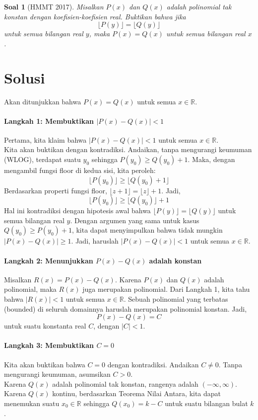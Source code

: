 \documentclass[12pt]{article}
\theoremstyle{mystyle}
\newtheorem{problem}{Soal}
\begin{document}
\begin{problem}[HMMT 2017]
Misalkan $P(x)$ dan $Q(x)$ adalah polinomial tak konstan dengan koefisien-koefisien real. Buktikan bahwa jika
\[ \lfloor P(y) \rfloor = \lfloor Q(y) \rfloor \]
untuk semua bilangan real $y$, maka $P(x) = Q(x)$ untuk semua bilangan real $x$.
\end{problem}

\section*{Solusi}
\noindent
Akan ditunjukkan bahwa $P(x)=Q(x)$ untuk semua $x \in \mathbb{R}$.

\paragraph{Langkah 1: Membuktikan $|P(x) - Q(x)| < 1$}
Pertama, kita klaim bahwa $|P(x) - Q(x)| < 1$ untuk semua $x \in \mathbb{R}$. \\
Kita akan buktikan dengan kontradiksi. Andaikan, tanpa mengurangi keumuman (WLOG), terdapat suatu $y_0$ sehingga $P(y_0) \ge Q(y_0) + 1$. Maka, dengan mengambil fungsi floor di kedua sisi, kita peroleh:
\[ \lfloor P(y_0) \rfloor \ge \lfloor Q(y_0) + 1 \rfloor \]
Berdasarkan properti fungsi floor, $\lfloor z+1 \rfloor = \lfloor z \rfloor + 1$. Jadi,
\[ \lfloor P(y_0) \rfloor \ge \lfloor Q(y_0) \rfloor + 1 \]
Hal ini kontradiksi dengan hipotesis awal bahwa $\lfloor P(y) \rfloor = \lfloor Q(y) \rfloor$ untuk semua bilangan real $y$. Dengan argumen yang sama untuk kasus $Q(y_0) \ge P(y_0) + 1$, kita dapat menyimpulkan bahwa tidak mungkin $|P(x) - Q(x)| \ge 1$. Jadi, haruslah $|P(x) - Q(x)| < 1$ untuk semua $x \in \mathbb{R}$.

\paragraph{Langkah 2: Menunjukkan $P(x)-Q(x)$ adalah konstan}
Misalkan $R(x) = P(x) - Q(x)$. Karena $P(x)$ dan $Q(x)$ adalah polinomial, maka $R(x)$ juga merupakan polinomial. Dari Langkah 1, kita tahu bahwa $|R(x)| < 1$ untuk semua $x \in \mathbb{R}$. Sebuah polinomial yang terbatas (bounded) di seluruh domainnya haruslah merupakan polinomial konstan. Jadi,
\[ P(x) - Q(x) = C \]
untuk suatu konstanta real $C$, dengan $|C| < 1$.

\paragraph{Langkah 3: Membuktikan $C=0$}
Kita akan buktikan bahwa $C=0$ dengan kontradiksi. Andaikan $C \neq 0$. Tanpa mengurangi keumuman, asumsikan $C>0$. \\
Karena $Q(x)$ adalah polinomial tak konstan, rangenya adalah $(-\infty, \infty)$. Karena $Q(x)$ kontinu, berdasarkan Teorema Nilai Antara, kita dapat menemukan suatu $x_0 \in \mathbb{R}$ sehingga $Q(x_0) = k - C$ untuk suatu bilangan bulat $k$.
\end{document}
